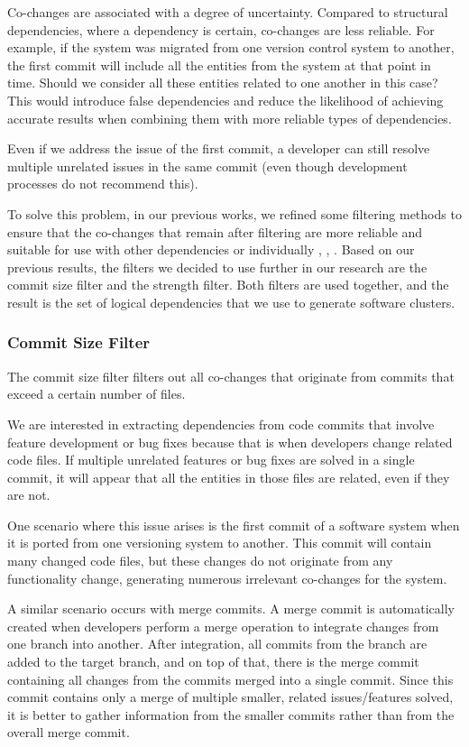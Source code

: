 \documentclass{ieeeaccess}
\begin{document}
Co-changes are associated with a degree of uncertainty. Compared to structural dependencies, where a dependency is certain, co-changes are less reliable. For example, if the system was migrated from one version control system to another, the first commit will include all the entities from the system at that point in time. Should we consider all these entities related to one another in this case? This would introduce false dependencies and reduce the likelihood of achieving accurate results when combining them with more reliable types of dependencies.

Even if we address the issue of the first commit, a developer can still resolve multiple unrelated issues in the same commit (even though development processes do not recommend this).

To solve this problem, in our previous works, we refined some filtering methods to ensure that the co-changes that remain after filtering are more reliable and suitable for use with other dependencies or individually \cite{b4}, \cite{b5}, \cite{b6}. Based on our previous results, the filters we decided to use further in our research are the commit size filter and the strength filter. Both filters are used together, and the result is the set of logical dependencies that we use to generate software clusters.

\subsubsection{Commit Size Filter}

The commit size filter filters out all co-changes that originate from commits that exceed a certain number of files.

We are interested in extracting dependencies from code commits that involve feature development or bug fixes because that is when developers change related code files. If multiple unrelated features or bug fixes are solved in a single commit, it will appear that all the entities in those files are related, even if they are not.

One scenario where this issue arises is the first commit of a software system when it is ported from one versioning system to another. This commit will contain many changed code files, but these changes do not originate from any functionality change, generating numerous irrelevant co-changes for the system.

A similar scenario occurs with merge commits. A merge commit is automatically created when developers perform a merge operation to integrate changes from one branch into another. After integration, all commits from the branch are added to the target branch, and on top of that, there is the merge commit containing all changes from the commits merged into a single commit. Since this commit contains only a merge of multiple smaller, related issues/features solved, it is better to gather information from the smaller commits rather than from the overall merge commit.
\end{document}
